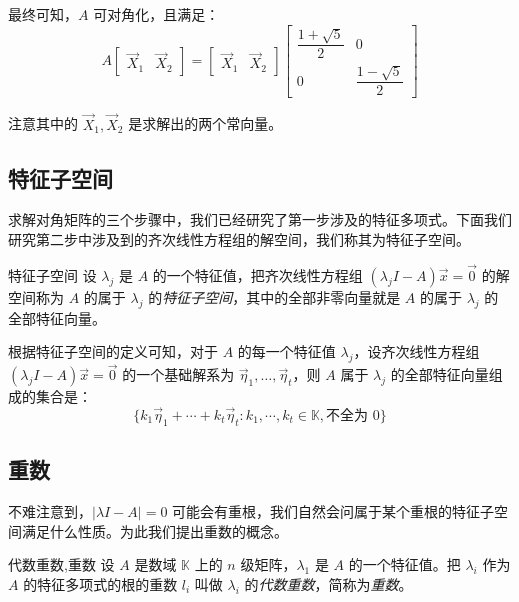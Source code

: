 \begin{solve}
	最终可知，$A$ 可对角化，且满足：
	$$
	A \begin{bmatrix} \vec X_1 & \vec X_2 \end{bmatrix} = \begin{bmatrix} \vec X_1 & \vec X_2 \end{bmatrix} \begin{bmatrix} \dfrac{1 + \sqrt 5}{2} & 0 \\ 0 & \dfrac{1 - \sqrt 5}{2} \end{bmatrix}
	$$

	注意其中的 $\vec X_1, \vec X_2$ 是求解出的两个常向量。
\end{solve}

\subsection{特征子空间}

求解对角矩阵的三个步骤中，我们已经研究了第一步涉及的特征多项式。下面我们研究第二步中涉及到的齐次线性方程组的解空间，我们称其为特征子空间。

\begin{definition}{特征子空间}
	设 $\lambda_j$ 是 $A$ 的一个特征值，把齐次线性方程组 $(\lambda_j I - A) \vec x = \vec 0$ 的解空间称为 $A$ 的属于 $\lambda_j$ 的\emph{特征子空间}，其中的全部非零向量就是 $A$ 的属于 $\lambda_j$ 的全部特征向量。
\end{definition}

根据特征子空间的定义可知，对于 $A$ 的每一个特征值 $\lambda_j$，设齐次线性方程组 $(\lambda_j I - A) \vec x = \vec 0$ 的一个基础解系为 $\vec \eta_1, \ldots, \vec \eta_t$，则 $A$ 属于 $\lambda_j$ 的全部特征向量组成的集合是：
$$
\{ k_1 \vec \eta_1 + \cdots + k_t \vec \eta_t \colon k_1, \cdots, k_t \in \mathbb K, \text{不全为 $0$} \}
$$

\subsection{重数}

不难注意到，$|\lambda I - A| = 0$ 可能会有重根，我们自然会问属于某个重根的特征子空间满足什么性质。为此我们提出重数的概念。

\begin{definition}{代数重数,重数}
	设 $A$ 是数域 $\mathbb K$ 上的 $n$ 级矩阵，$\lambda_1$ 是 $A$ 的一个特征值。把 $\lambda_i$ 作为 $A$ 的特征多项式的根的重数 $l_i$ 叫做 $\lambda_i$ 的\emph{代数重数}，简称为\emph{重数}。
\end{definition}

